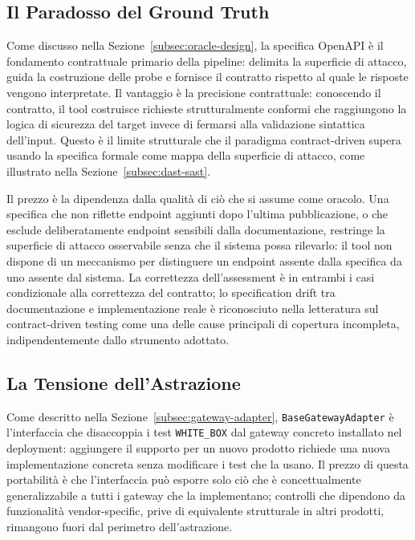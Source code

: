\subsection{Il Paradosso del Ground Truth}\label{subsec:limite-ground-truth}

Come discusso nella Sezione~\ref{subsec:oracle-design}, la specifica OpenAPI è il fondamento contrattuale primario della pipeline: delimita la superficie di attacco, guida la costruzione delle probe e fornisce il contratto rispetto al quale le risposte vengono interpretate.
Il vantaggio è la precisione contrattuale: conoscendo il contratto, il tool costruisce richieste strutturalmente conformi che raggiungono la logica di sicurezza del target invece di fermarsi alla validazione sintattica dell'input. Questo è il limite strutturale che il paradigma contract-driven supera usando la specifica formale come mappa della superficie di attacco, come illustrato nella Sezione~\ref{subsec:dast-sast}.

Il prezzo è la dipendenza dalla qualità di ciò che si assume come oracolo. Una specifica che non riflette endpoint aggiunti dopo l'ultima pubblicazione, o che esclude deliberatamente endpoint sensibili dalla documentazione, restringe la superficie di attacco osservabile senza che il sistema possa rilevarlo: il tool non dispone di un meccanismo per distinguere un endpoint assente dalla specifica da uno assente dal sistema. La correttezza dell'assessment è in entrambi i casi condizionale alla correttezza del contratto; lo specification drift tra documentazione e implementazione reale è riconosciuto nella letteratura sul contract-driven testing come una delle cause principali di copertura incompleta, indipendentemente dallo strumento adottato.

\subsection{La Tensione dell'Astrazione}\label{subsec:limite-astrazione}

Come descritto nella Sezione~\ref{subsec:gateway-adapter}, \texttt{BaseGatewayAdapter} è l'interfaccia che disaccoppia i test \texttt{WHITE\_BOX} dal gateway concreto installato nel deployment: aggiungere il supporto per un nuovo prodotto richiede una nuova implementazione concreta senza modificare i test che la usano. Il prezzo di questa portabilità è che l'interfaccia può esporre solo ciò che è concettualmente generalizzabile a tutti i gateway che la implementano; controlli che dipendono da funzionalità vendor-specific, prive di equivalente strutturale in altri prodotti, rimangono fuori dal perimetro dell'astrazione.

